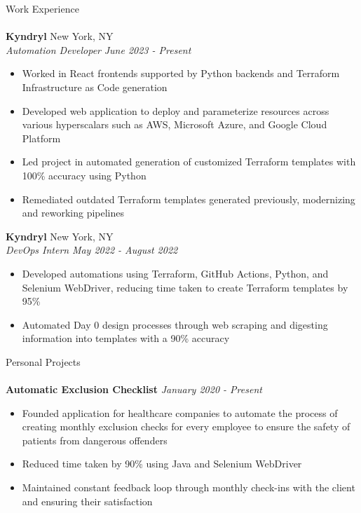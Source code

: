 \documentclass[10pt]{article}
\newcommand{\lineunder} {
    \vspace*{-8pt} \\
    \hspace*{-18pt} \hrulefill \\
}
\newcommand{\header}[1]{
    {\hspace*{-18pt}\vspace*{6pt} #1}
    \vspace*{-6pt} \lineunder
}
\begin{document}
\header{Work Experience}
\textbf{Kyndryl} \hfill New York, NY\\
\textit{Automation Developer} \hfill \textit{June 2023 - Present}\\
\vspace{-2mm}
\begin{itemize}[noitemsep,parsep=0pt,partopsep=0pt]\itemsep 1pt
    \item Worked in React frontends supported by Python backends and Terraform Infrastructure as Code generation
    \item Developed web application to deploy and parameterize resources across various hyperscalars such as AWS, Microsoft Azure, and Google Cloud Platform
    \item Led project in automated generation of customized Terraform templates with 100\% accuracy using Python
    \item Remediated outdated Terraform templates generated previously, modernizing and reworking pipelines
\end{itemize}
\vspace{-1mm}
\textbf{Kyndryl} \hfill New York, NY\\
\textit{DevOps Intern} \hfill \textit{May 2022 - August 2022}\\
\vspace{-2mm}
\begin{itemize}[noitemsep,parsep=0pt,partopsep=0pt]\itemsep 1pt
    \item Developed automations using Terraform, GitHub Actions, Python, and Selenium WebDriver, reducing time taken to create Terraform templates by 95\%
    \item Automated Day 0 design processes through web scraping and digesting information into templates with a 90\% accuracy
\end{itemize}

\vspace{2mm}
\header{Personal Projects}
{\textbf{Automatic Exclusion Checklist}} \hfill \textit{January 2020 - Present}
\begin{itemize}[noitemsep,topsep=0.5pt, parsep=0pt,partopsep=0pt]
    \item Founded application for healthcare companies to automate the process of creating monthly exclusion checks for every employee to ensure the safety of patients from dangerous offenders
    \item Reduced time taken by 90\% using Java and Selenium WebDriver
    \item Maintained constant feedback loop through monthly check-ins with the client and ensuring their satisfaction
\end{itemize}
\end{document}
